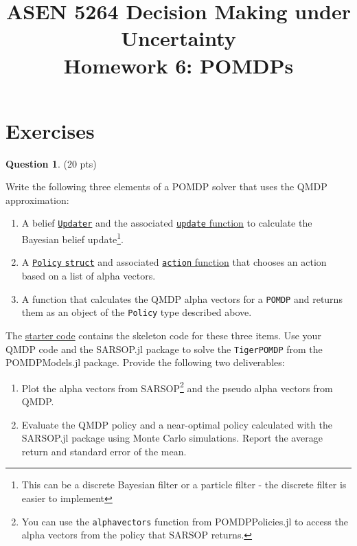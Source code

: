 \documentclass{article}
\title{ASEN 5264 Decision Making under Uncertainty\\
       Homework 6: POMDPs}
\theoremstyle{definition}
\newtheorem{question}[thm]{Question}
\begin{document}
\maketitle



\section{Exercises}

\begin{question} \label{q:tiger}
    (20 pts)

    Write the following three elements of a POMDP solver that uses the QMDP approximation:
    \begin{enumerate}[noitemsep]
        \item A belief \href{https://juliapomdp.github.io/POMDPs.jl/stable/def_updater/}{\texttt{Updater}} and the associated \href{https://juliapomdp.github.io/POMDPs.jl/stable/api/#POMDPs.update}{\texttt{update} function} to calculate the Bayesian belief update\footnote{This can be a discrete Bayesian filter or a particle filter - the discrete filter is easier to implement}.
        \item A \href{https://juliapomdp.github.io/POMDPs.jl/stable/concepts/#Solvers-and-Policies}{\texttt{Policy} \texttt{struct}} and associated \href{https://juliapomdp.github.io/POMDPs.jl/stable/api/#POMDPs.action}{\texttt{action} function} that chooses an action based on a list of alpha vectors.
        \item A function that calculates the QMDP alpha vectors for a \texttt{POMDP} and returns them as an object of the \texttt{Policy} type described above.
    \end{enumerate}
    The \href{https://github.com/zsunberg/CU-DMU-Materials/blob/master/hw/6-POMDPs/starter_code.jl}{starter code} contains the skeleton code for these three items. Use your QMDP code and the SARSOP.jl package to solve the \texttt{TigerPOMDP} from the POMDPModels.jl package. Provide the following two deliverables:
    \begin{enumerate}[label=\alph*)]
        \item Plot the alpha vectors from SARSOP\footnote{You can use the \texttt{alphavectors} function from POMDPPolicies.jl to access the alpha vectors from the policy that SARSOP returns.} and the pseudo alpha vectors from QMDP.
        \item Evaluate the QMDP policy and a near-optimal policy calculated with the SARSOP.jl package using Monte Carlo simulations. Report the average return and standard error of the mean.
    \end{enumerate}
\end{question}
\end{document}
